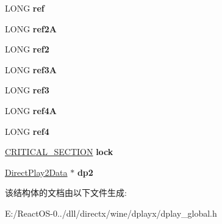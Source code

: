 \begin{DoxyCompactItemize}
\mbox{\label{struct_i_direct_play_impl_ae452e9e41db222629d0e987bb96a5663}} 
L\+O\+NG {\bfseries ref}
\item 
\mbox{\label{struct_i_direct_play_impl_a064dbb29a4ecd6d766f9228834f960a6}} 
L\+O\+NG {\bfseries ref2A}
\item 
\mbox{\label{struct_i_direct_play_impl_a25780a2c9b5e149e11cb6481d0f93155}} 
L\+O\+NG {\bfseries ref2}
\item 
\mbox{\label{struct_i_direct_play_impl_aa192db8883e8fb7a5ca7d9b09d710c49}} 
L\+O\+NG {\bfseries ref3A}
\item 
\mbox{\label{struct_i_direct_play_impl_a56969a84d731417398403429f8624248}} 
L\+O\+NG {\bfseries ref3}
\item 
\mbox{\label{struct_i_direct_play_impl_a201af920b6aaff964853a43d42ee3c2d}} 
L\+O\+NG {\bfseries ref4A}
\item 
\mbox{\label{struct_i_direct_play_impl_ab48fcf163575f8bfbf0bdcf663dec6fe}} 
L\+O\+NG {\bfseries ref4}
\item 
\mbox{\label{struct_i_direct_play_impl_a881ed9b7f2074b2112eeb62edd58538b}} 
\hyperlink{struct___c_r_i_t_i_c_a_l___s_e_c_t_i_o_n}{C\+R\+I\+T\+I\+C\+A\+L\+\_\+\+S\+E\+C\+T\+I\+ON} {\bfseries lock}
\item 
\mbox{\label{struct_i_direct_play_impl_a997452e5a0584c34d5022d1f558b00ac}} 
\hyperlink{structtag_direct_play2_data}{Direct\+Play2\+Data} $\ast$ {\bfseries dp2}
\end{DoxyCompactItemize}


该结构体的文档由以下文件生成\+:\begin{DoxyCompactItemize}
\item 
E\+:/\+React\+O\+S-\/0../dll/directx/wine/dplayx/dplay\+\_\+global.\+h\end{DoxyCompactItemize}
